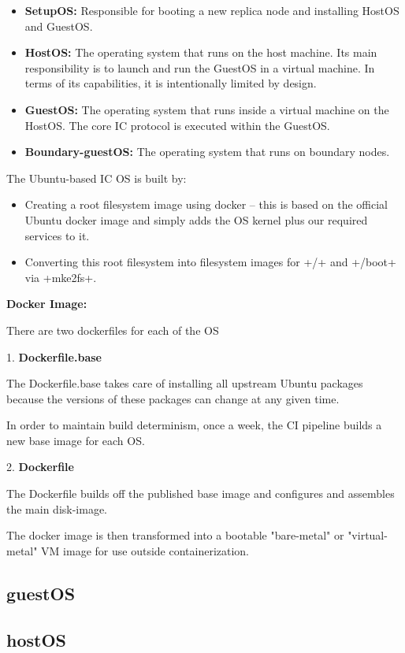\begin{itemize}
  \item \textbf{SetupOS:} Responsible for booting a new replica node and installing HostOS and GuestOS.
  \item \textbf{HostOS:} The operating system that runs on the host machine. Its main responsibility is to launch and run the GuestOS in a virtual machine. In terms of its capabilities, it is intentionally limited by design.
  \item \textbf{GuestOS:} The operating system that runs inside a virtual machine on the HostOS. The core IC protocol is executed within the GuestOS.
  \item \textbf{Boundary-guestOS:} The operating system that runs on boundary nodes.
\end{itemize}

The Ubuntu-based IC OS is built by:

\begin{itemize}
  \item Creating a root filesystem image using docker -- this is based on the official Ubuntu docker image and simply adds the OS kernel plus our required services to it.
  \item Converting this root filesystem into filesystem images for +/+ and +/boot+ via +mke2fs+.
\end{itemize}

\textbf{Docker Image:}

There are two dockerfiles for each of the OS

1. \textbf{Dockerfile.base}

The Dockerfile.base takes care of installing all upstream Ubuntu packages because the versions of these packages can change at any given time.

In order to maintain build determinism, once a week, the CI pipeline builds a new base image for each OS.

2. \textbf{Dockerfile}

The Dockerfile builds off the published base image and configures and assembles the main disk-image.

The docker image is then transformed into a bootable "bare-metal" or "virtual-metal" VM image for use outside containerization.

\subsection{guestOS}

\subsection{hostOS}

